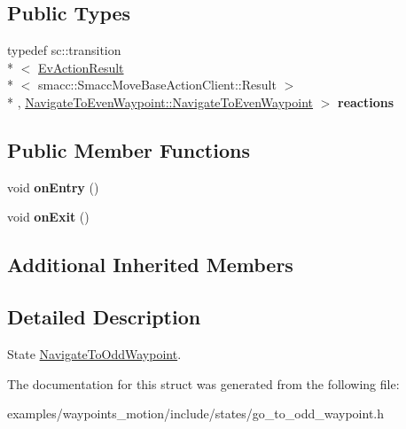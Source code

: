 \subsection*{Public Types}
\begin{DoxyCompactItemize}
\item 
\hypertarget{structNavigateToOddWaypoint_1_1NavigateToOddWaypoint_a23bbe6ff0cf5fedf9db62498a75e0cea}{typedef sc\-::transition\\*
$<$ \hyperlink{structsmacc_1_1EvActionResult}{Ev\-Action\-Result}\\*
$<$ smacc\-::\-Smacc\-Move\-Base\-Action\-Client\-::\-Result $>$\\*
, \hyperlink{structNavigateToEvenWaypoint_1_1NavigateToEvenWaypoint}{Navigate\-To\-Even\-Waypoint\-::\-Navigate\-To\-Even\-Waypoint} $>$ {\bfseries reactions}}\label{structNavigateToOddWaypoint_1_1NavigateToOddWaypoint_a23bbe6ff0cf5fedf9db62498a75e0cea}

\end{DoxyCompactItemize}
\subsection*{Public Member Functions}
\begin{DoxyCompactItemize}
\item 
\hypertarget{structNavigateToOddWaypoint_1_1NavigateToOddWaypoint_a90a02cb4090f1274da0c101452afa87e}{void {\bfseries on\-Entry} ()}\label{structNavigateToOddWaypoint_1_1NavigateToOddWaypoint_a90a02cb4090f1274da0c101452afa87e}

\item 
\hypertarget{structNavigateToOddWaypoint_1_1NavigateToOddWaypoint_a6f4e1c3d45882b6bb75b4d4f9c1d2549}{void {\bfseries on\-Exit} ()}\label{structNavigateToOddWaypoint_1_1NavigateToOddWaypoint_a6f4e1c3d45882b6bb75b4d4f9c1d2549}

\end{DoxyCompactItemize}
\subsection*{Additional Inherited Members}


\subsection{Detailed Description}
State \hyperlink{structNavigateToOddWaypoint_1_1NavigateToOddWaypoint}{Navigate\-To\-Odd\-Waypoint}. 

The documentation for this struct was generated from the following file\-:\begin{DoxyCompactItemize}
\item 
examples/waypoints\-\_\-motion/include/states/go\-\_\-to\-\_\-odd\-\_\-waypoint.\-h\end{DoxyCompactItemize}
